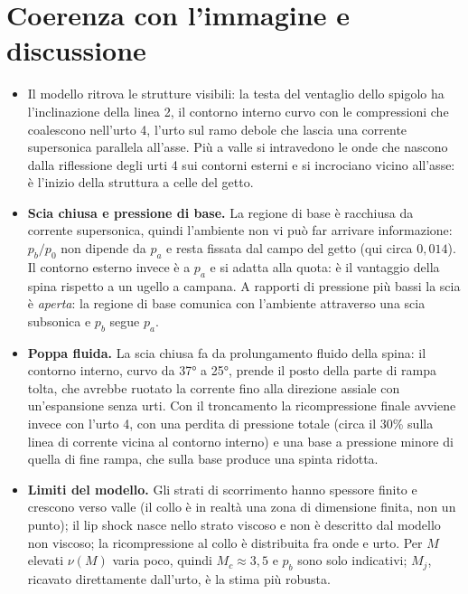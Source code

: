 \documentclass[11pt,a4paper]{article}
\begin{document}
\section{Coerenza con l'immagine e discussione}
\begin{itemize}
\item Il modello ritrova le strutture visibili: la testa del ventaglio dello spigolo ha l'inclinazione della linea 2,
  il contorno interno curvo con le compressioni che coalescono nell'urto 4, l'urto sul ramo debole che lascia una
  corrente supersonica parallela all'asse. Più a valle si intravedono le onde che nascono dalla riflessione degli urti
  4 sui contorni esterni e si incrociano vicino all'asse: è l'inizio della struttura a celle del getto.
\item \textbf{Scia chiusa e pressione di base.} La regione di base è racchiusa da corrente supersonica, quindi
  l'ambiente non vi può far arrivare informazione: $p_b/p_0$ non dipende da $p_a$ e resta fissata dal campo del getto
  (qui circa $0{,}014$). Il contorno esterno invece è a $p_a$ e si adatta alla quota: è il vantaggio della spina
  rispetto a un ugello a campana. A rapporti di pressione più bassi la scia è \emph{aperta}: la regione di base
  comunica con l'ambiente attraverso una scia subsonica e $p_b$ segue $p_a$.
\item \textbf{Poppa fluida.} La scia chiusa fa da prolungamento fluido della spina: il contorno interno, curvo da
  \ang{37} a \ang{25}, prende il posto della parte di rampa tolta, che avrebbe ruotato la corrente fino alla
  direzione assiale con un'espansione senza urti. Con il troncamento la ricompressione finale avviene invece con
  l'urto 4, con una perdita di pressione totale (circa il 30\% sulla linea di corrente vicina al contorno interno) e
  una base a pressione minore di quella di fine rampa, che sulla base produce una spinta ridotta.
\item \textbf{Limiti del modello.} Gli strati di scorrimento hanno spessore finito e crescono verso valle (il collo è
  in realtà una zona di dimensione finita, non un punto); il lip shock nasce nello strato viscoso e non è descritto
  dal modello non viscoso; la ricompressione al collo è distribuita fra onde e urto. Per $M$ elevati $\nu(M)$ varia
  poco, quindi $M_c\approx3{,}5$ e $p_b$ sono solo indicativi; $M_j$, ricavato direttamente dall'urto, è la stima più
  robusta.
\end{itemize}
\end{document}
